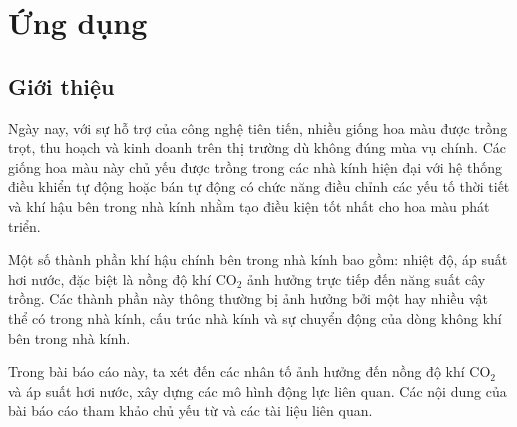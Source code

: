 \documentclass[a4paper]{article}
\begin{document}
\section{Ứng dụng}
\subsection{Giới thiệu}
Ngày nay, với sự hỗ trợ của công nghệ tiên tiến, nhiều giống hoa màu được trồng trọt, thu hoạch và kinh doanh trên thị trường dù không đúng mùa vụ chính. Các giống hoa màu này chủ yếu được trồng trong các nhà kính hiện đại với hệ thống điều khiển tự động hoặc bán tự động có chức năng điều chỉnh các yếu tố thời tiết và khí hậu bên trong nhà kính nhằm tạo điều kiện tốt nhất cho hoa màu phát triển. \par
Một số thành phần khí hậu chính bên trong nhà kính bao gồm: nhiệt độ, áp suất hơi nước, đặc biệt là nồng độ khí $\mathrm{CO_2}$ ảnh hưởng trực tiếp đến năng suất cây trồng. Các thành phần này thông thường bị ảnh hưởng bởi một hay nhiều vật thể có trong nhà kính, cấu trúc nhà kính và sự chuyển động của dòng không khí bên trong nhà kính. \par
Trong bài báo cáo này, ta xét đến các nhân tố ảnh hưởng đến nồng độ khí $\mathrm{CO_2}$ và áp suất hơi nước, xây dựng các mô hình động lực liên quan. Các nội dung của bài báo cáo tham khảo chủ yếu từ \cite{vanthoor2011model} và các tài liệu liên quan.
\end{document}

